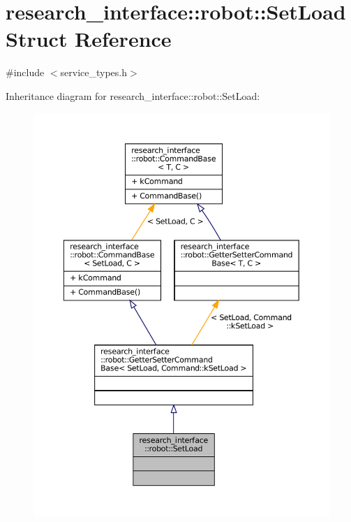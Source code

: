 \hypertarget{structresearch__interface_1_1robot_1_1SetLoad}{}\section{research\+\_\+interface\+:\+:robot\+:\+:Set\+Load Struct Reference}
\label{structresearch__interface_1_1robot_1_1SetLoad}


{\ttfamily \#include $<$service\+\_\+types.\+h$>$}



Inheritance diagram for research\+\_\+interface\+:\+:robot\+:\+:Set\+Load\+:
\nopagebreak
\begin{figure}[H]
\begin{center}
\leavevmode
\includegraphics[width=350pt]{structresearch__interface_1_1robot_1_1SetLoad__inherit__graph}
\end{center}
\end{figure}


